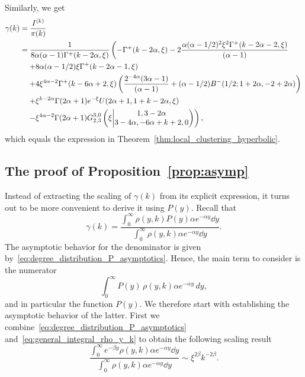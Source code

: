 Similarly, we get
\begin{align*}
	\gamma(k) &= \frac{I^{(k)}}{\pmf(k)} \\
	&=\frac{1}{8\alpha (\alpha-1)\Gamma^+(k-2\alpha,\xi)} \left( -\Gamma^+(k - 2 \alpha, \xi) 
		- 2\frac{\alpha (\alpha - 1/2)^2 \xi^{2} \Gamma^+(k - 2 \alpha - 2, \xi)}{(\alpha - 1)} \right. \\ 
	&\hspace{10pt}\left.+ 8 \alpha (\alpha - 1/2) \xi \Gamma^+(k - 2 \alpha - 1,\xi) \right.\\ 
	&\hspace{10pt}\left.+ 4\xi^{4\alpha - 2} \Gamma^+(k - 6 \alpha + 2, 
      \xi) \left( \frac{2^{ - 4\alpha}(3 \alpha - 1)}{(\alpha - 1)} + (\alpha - 1/2) B^-(1/2; 1 + 2 \alpha, -2 + 2 \alpha) \right)  \right.\\ 
	&\hspace{10pt}\left.+ \xi^{k-2\alpha} \Gamma(2\alpha+1)e^{-\xi} U(2\alpha+1,1+k-2\alpha,\xi) \right. \\ 
	&\hspace{10pt}\left.- \xi^{4\alpha-2} \Gamma(2\alpha+1)\MeijerGnew{3}{0}{2}{3}{1,3-2\alpha}{3-4\alpha,-6\alpha+k+2,0}{\xi}  \right),
\end{align*}
which equals the expression in Theorem~\ref{thm:local_clustering_hyperbolic}. %


\subsection{The proof of Proposition~\ref{prop:asymp}\label{ssec:asymptotics_local_clustering_P}}

Instead of extracting the scaling of $\gamma(k)$ from its explicit expression, it turns out to be more convenient to derive it using $P(y)$. Recall that
\[
	\gamma(k) = \frac{\int_0^\infty \rho(y,k) P(y) \alpha e^{-\alpha y} \dd y}{\int_0^\infty \rho(y,k) \alpha e^{-\alpha y} \dd y}.
\]
The asymptotic behavior for the denominator is given by~\eqref{eq:degree_distribution_P_asymptotics}. Hence, the main term to consider is the numerator
\[
	\int_0^{\infty} P(y) \, \rho(y,k) \alpha e^{-\alpha y} \, dy,
\]
and in particular the function $P(y)$. We therefore start with establishing the asymptotic behavior of the latter. First we combine~\eqref{eq:degree_distribution_P_asymptotics} and~\eqref{eq:general_integral_rho_y_k} to obtain the following scaling result
\begin{equation}\label{eq:general_clustering_integral_scaling}
	\frac{\int_0^\infty e^{-\beta y} \rho(y,k) \alpha e^{-\alpha y} \dd y}
	{\int_0^\infty \rho(y,k) \alpha e^{-\alpha y} \dd y}
	\sim \xi^{2\beta} k^{-2\beta}.
\end{equation}


